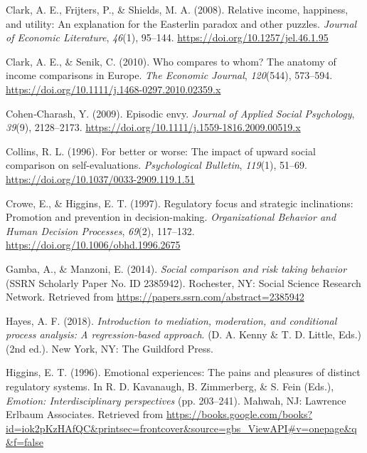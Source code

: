 \documentclass[man,floatsintext]{apa6}
\begin{document}
\leavevmode\hypertarget{ref-clarketal2008}{}%
Clark, A. E., Frijters, P., \& Shields, M. A. (2008). Relative income, happiness, and utility: An explanation for the Easterlin paradox and other puzzles. \emph{Journal of Economic Literature}, \emph{46}(1), 95--144. \url{https://doi.org/10.1257/jel.46.1.95}

\leavevmode\hypertarget{ref-clarksenik2010}{}%
Clark, A. E., \& Senik, C. (2010). Who compares to whom? The anatomy of income comparisons in Europe. \emph{The Economic Journal}, \emph{120}(544), 573--594. \url{https://doi.org/10.1111/j.1468-0297.2010.02359.x}

\leavevmode\hypertarget{ref-cohen-charash2009}{}%
Cohen‐Charash, Y. (2009). Episodic envy. \emph{Journal of Applied Social Psychology}, \emph{39}(9), 2128--2173. \url{https://doi.org/10.1111/j.1559-1816.2009.00519.x}

\leavevmode\hypertarget{ref-collins1996}{}%
Collins, R. L. (1996). For better or worse: The impact of upward social comparison on self-evaluations. \emph{Psychological Bulletin}, \emph{119}(1), 51--69. \url{https://doi.org/10.1037/0033-2909.119.1.51}

\leavevmode\hypertarget{ref-crowehiggins1997}{}%
Crowe, E., \& Higgins, E. T. (1997). Regulatory focus and strategic inclinations: Promotion and prevention in decision-making. \emph{Organizational Behavior and Human Decision Processes}, \emph{69}(2), 117--132. \url{https://doi.org/10.1006/obhd.1996.2675}

\leavevmode\hypertarget{ref-gambamanzoni2014}{}%
Gamba, A., \& Manzoni, E. (2014). \emph{Social comparison and risk taking behavior} (SSRN Scholarly Paper No. ID 2385942). Rochester, NY: Social Science Research Network. Retrieved from \url{https://papers.ssrn.com/abstract=2385942}

\leavevmode\hypertarget{ref-hayes2018}{}%
Hayes, A. F. (2018). \emph{Introduction to mediation, moderation, and conditional process analysis: A regression-based approach}. (D. A. Kenny \& T. D. Little, Eds.) (2nd ed.). New York, NY: The Guildford Press.

\leavevmode\hypertarget{ref-higgins1996d}{}%
Higgins, E. T. (1996). Emotional experiences: The pains and pleasures of distinct regulatory systems. In R. D. Kavanaugh, B. Zimmerberg, \& S. Fein (Eds.), \emph{Emotion: Interdisciplinary perspectives} (pp. 203--241). Mahwah, NJ: Lawrence Erlbaum Associates. Retrieved from \url{https://books.google.com/books?id=iok2pKzHAfQC\&printsec=frontcover\&source=gbs_ViewAPI\#v=onepage\&q\&f=false}
\end{document}
